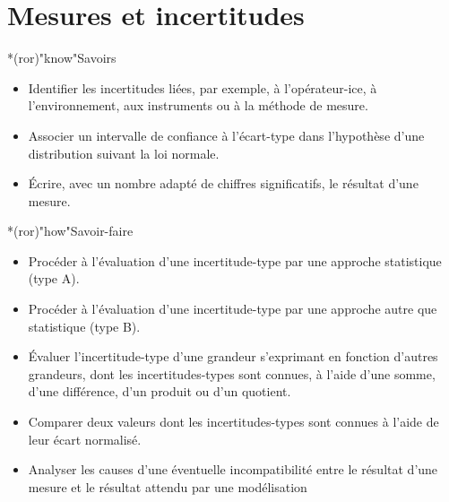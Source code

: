 \documentclass[../main/main.tex]{subfiles}
\begin{document}
\setcounter{chapter}{1}

\chapter{Mesures et incertitudes}

\vfill

\begin{prgm}
	\begin{tcb}*(ror)"know"{Savoirs}
		\begin{itemize}[label=$\diamond$, leftmargin=10pt]
			\item Identifier les incertitudes liées, par exemple, à l'opérateur-ice, à
			      l'environnement, aux instruments ou à la méthode de mesure.
			\item Associer un intervalle de confiance à l'écart-type dans l'hypothèse
			      d'une distribution suivant la loi normale.
			\item Écrire, avec un nombre adapté de chiffres significatifs, le résultat
			      d’une mesure.
		\end{itemize}
	\end{tcb}

	\begin{tcb}*(ror)"how"{Savoir-faire}
		\begin{itemize}[label=$\diamond$, leftmargin=10pt]
			\item Procéder à l'évaluation d'une incertitude-type par une approche
			      statistique (type A).
			\item Procéder à l'évaluation d'une incertitude-type par une approche
			      autre que statistique (type B).
			\item Évaluer l'incertitude-type d'une grandeur s'exprimant en fonction
			      d'autres grandeurs, dont les incertitudes-types sont connues, à
			      l'aide d'une somme, d'une différence, d'un produit ou d'un quotient.
			\item Comparer deux valeurs dont les incertitudes-types sont connues à
			      l'aide de leur écart normalisé.
			\item Analyser les causes d’une éventuelle incompatibilité entre le
			      résultat d’une mesure et le résultat attendu par une modélisation
		\end{itemize}
	\end{tcb}
\end{prgm}
\end{document}
